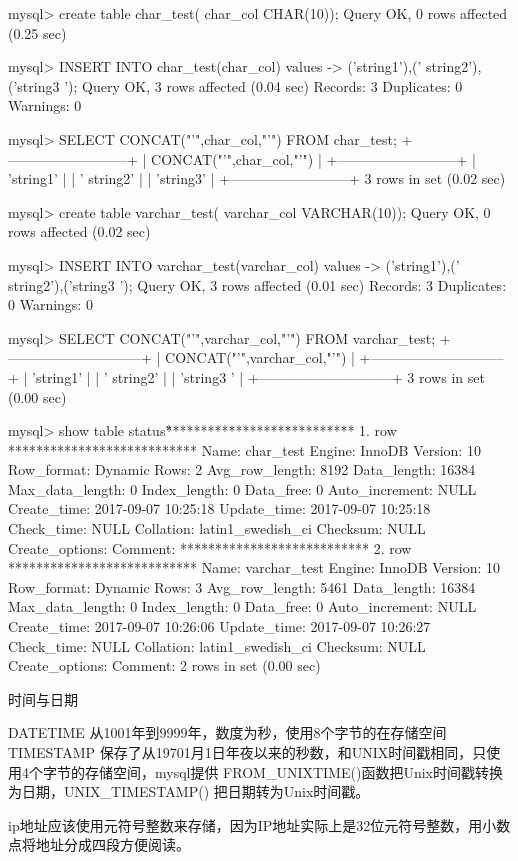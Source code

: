 mysql>  create table char_test( char_col CHAR(10));
Query OK, 0 rows affected (0.25 sec)

mysql> INSERT INTO char_test(char_col) values
    -> ('string1'),('   string2'),('string3 ');
Query OK, 3 rows affected (0.04 sec)
Records: 3  Duplicates: 0  Warnings: 0

mysql> SELECT CONCAT("'",char_col,"'") FROM char_test;
+--------------------------+
| CONCAT("'",char_col,"'") |
+--------------------------+
| 'string1'                |
| '   string2'             |
| 'string3'                |
+--------------------------+
3 rows in set (0.02 sec)

mysql> create table varchar_test( varchar_col VARCHAR(10));
Query OK, 0 rows affected (0.02 sec)

mysql> INSERT INTO varchar_test(varchar_col) values
    -> ('string1'),('   string2'),('string3 ');
Query OK, 3 rows affected (0.01 sec)
Records: 3  Duplicates: 0  Warnings: 0

mysql> SELECT CONCAT("'",varchar_col,"'") FROM varchar_test;
+-----------------------------+
| CONCAT("'",varchar_col,"'") |
+-----------------------------+
| 'string1'                   |
| '   string2'                |
| 'string3 '                  |
+-----------------------------+
3 rows in set (0.00 sec)

mysql> show table status\G
*************************** 1. row ***************************
           Name: char_test
         Engine: InnoDB
        Version: 10
     Row_format: Dynamic
           Rows: 2
 Avg_row_length: 8192
    Data_length: 16384
Max_data_length: 0
   Index_length: 0
      Data_free: 0
 Auto_increment: NULL
    Create_time: 2017-09-07 10:25:18
    Update_time: 2017-09-07 10:25:18
     Check_time: NULL
      Collation: latin1_swedish_ci
       Checksum: NULL
 Create_options: 
        Comment: 
*************************** 2. row ***************************
           Name: varchar_test
         Engine: InnoDB
        Version: 10
     Row_format: Dynamic
           Rows: 3
 Avg_row_length: 5461
    Data_length: 16384
Max_data_length: 0
   Index_length: 0
      Data_free: 0
 Auto_increment: NULL
    Create_time: 2017-09-07 10:26:06
    Update_time: 2017-09-07 10:26:27
     Check_time: NULL
      Collation: latin1_swedish_ci
       Checksum: NULL
 Create_options: 
        Comment: 
2 rows in set (0.00 sec)



时间与日期

DATETIME 从1001年到9999年，数度为秒，使用8个字节的在存储空间
TIMESTAMP 保存了从19701月1日年夜以来的秒数，和UNIX时间戳相同，只使用4个字节的存储空间，mysql提供 FROM_UNIXTIME()函数把Unix时间戳转换为日期，UNIX_TIMESTAMP()
把日期转为Unix时间戳。

ip地址应该使用元符号整数来存储，因为IP地址实际上是32位元符号整数，用小数点将地址分成四段方便阅读。
